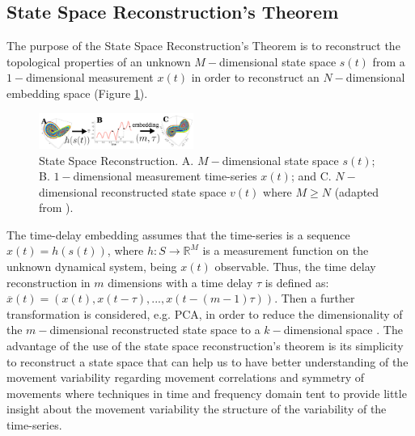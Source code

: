 \documentclass{sigchi}
\begin{document}
\subsection{State Space Reconstruction's Theorem}
The purpose of the State Space Reconstruction's Theorem is to reconstruct the
topological properties of an unknown $M-$dimensional state space $s(t)$ from a
$1-$dimensional measurement $x(t)$ in order to reconstruct an $N-$dimensional
embedding space
(Figure \ref{fig:takens_theorem}).
\begin{figure}
\centering
\includegraphics[width=0.45\textwidth]{figures/reconstructed_state_space/fig_v01}
\caption[PA]{State Space Reconstruction. A. $M-$dimensional state space $s(t)$;
B. $1-$dimensional measurement time-series $x(t)$; and
C. $N-$dimensional reconstructed state space $v(t)$
where $M \geq N$ (adapted from \cite{QuintanaDuque2012}).}
\label{fig:takens_theorem}
\end{figure}
The time-delay embedding assumes that the time-series is a sequence $x(t)=h(s(t))$,
where $h: S \rightarrow \mathbb{R}^M$ is a measurement function on the unknown
dynamical system, being $x(t)$ observable.
Thus, the time delay reconstruction in $m$ dimensions with a time delay
$\tau$ is defined as: $\overline{x}(t) = (x(t), x(t-\tau),...,x(t-(m-1)\tau))$.
Then a further transformation is considered, e.g. PCA, in order to reduce
the dimensionality of the $m-$dimensional reconstructed state space
to a $k-$dimensional space \cite{Uzal2011}.
The advantage of the use of the state space reconstruction's theorem is its
simplicity to reconstruct a state space that can help us to have better
understanding of the movement variability regarding movement correlations and
symmetry of movements where techniques in time and frequency domain tent to
provide little insight about the movement variability
the structure of the variability of the time-series.

\end{document}
